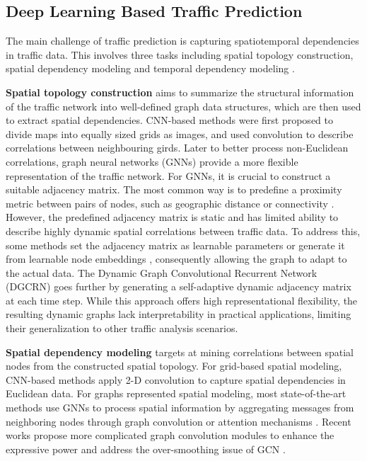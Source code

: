 \documentclass[letterpaper, 10 pt, conference]{ieeeconf}
\begin{document}
\subsection{Deep Learning Based Traffic Prediction}
The main challenge of traffic prediction is capturing spatiotemporal dependencies in traffic data. This involves three tasks including spatial topology construction, spatial dependency modeling and temporal dependency modeling \cite{li2021dynamic}.


\textbf{Spatial topology construction} aims to summarize the structural information of the traffic network into well-defined graph data structures, which are then used to extract spatial dependencies.
CNN-based methods \cite{yao2018deep,lin2019deepstn+} were first proposed to divide maps into equally sized grids as images, and used convolution to describe correlations between neighbouring girds. Later to better process non-Euclidean correlations, graph neural networks (GNNs) provide a more flexible representation of the traffic network. For GNNs, it is crucial to construct a suitable adjacency matrix. The most common way is to predefine a proximity metric between pairs of nodes, such as geographic distance or connectivity \cite{li2017diffusion,yu2017spatio,zheng2020gman}. However, the predefined adjacency matrix is static and has limited ability to describe highly dynamic spatial correlations between traffic data. To address this, some methods set the adjacency matrix as learnable parameters \cite{zhang2020spatio} or generate it from learnable node embeddings \cite{bai2020adaptive, wu2020connecting}, consequently allowing the graph to adapt to the actual data. The Dynamic Graph Convolutional Recurrent Network (DGCRN) \cite{li2021dynamic} goes further by generating a self-adaptive dynamic adjacency matrix at each time step. While this approach offers high representational flexibility, the resulting dynamic graphs lack interpretability in practical applications, limiting their generalization to other traffic analysis scenarios.

\textbf{Spatial dependency modeling} targets at mining correlations between spatial nodes from the constructed spatial topology. For grid-based spatial modeling, CNN-based methods \cite{yao2018deep,lin2019deepstn+} apply 2-D convolution to capture spatial dependencies in Euclidean data. For graphs represented spatial modeling, most state-of-the-art methods use GNNs to process spatial information by aggregating messages from neighboring nodes through graph convolution or attention mechanisms \cite{li2017diffusion,yu2017spatio,zheng2020gman}. Recent works propose more complicated graph convolution modules to enhance the expressive power and address the over-smoothing issue of GCN \cite{wu2020connecting}. 
\end{document}
